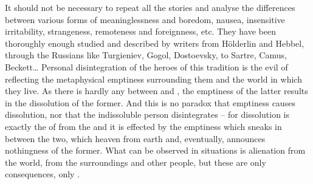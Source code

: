 It should not be necessary to repeat all the stories and analyse the
differences between various forms of meaninglessness and boredom, nausea,
insensitive irritability, strangeness, remoteness and foreignness, etc. They have
been thoroughly enough studied and described by writers from H\"{o}lderlin and
Hebbel, through the  Russians like Turgieniev, Gogol, Dostoevsky, to
Sartre, Camus, Beckett\ldots
Personal disintegration of the heroes of this tradition is the evil of
 reflecting the metaphysical emptiness surrounding them and the
world in which they live. As there is hardly any  between
 and , the  emptiness of the latter results in
the dissolution of the former. And this is no paradox that emptiness causes
dissolution, nor that the indissoluble person disintegrates -- for dissolution
is exactly the  of  from the  and it is
effected by the emptiness which sneaks in between the two, which
 heaven from earth and, eventually, announces nothingness of the former. 
What can be observed in  situations is alienation from
the world, from the surroundings and other people, but these are only 
consequences, only . 

